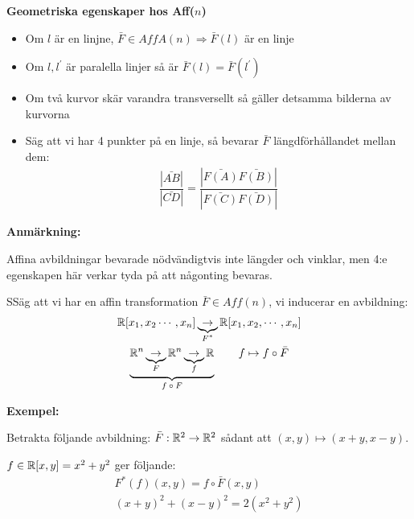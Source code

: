 \par\bigskip
\noindent\textbf{Geometriska egenskaper hos Aff($n$)}\par
\begin{itemize}
  \item Om $l$ är en linjne, $\bar{F}\in AffA(n) \Rightarrow\bar{F}(l)$ är en linje
  \item Om $l,l^{\prime}$ är paralella linjer så är $\bar{F}(l) = \bar{F}(l^{\prime})$
  \item Om två kurvor skär varandra transversellt så gäller detsamma bilderna av kurvorna 
  \item Säg att vi har 4 punkter på en linje, så bevarar $\bar{F}$ längdförhållandet mellan dem:
    \begin{equation*}
      \begin{gathered}
        \dfrac{\left|\bar{AB}\right|}{\left|\bar{CD}\right|} = \dfrac{\left|\bar{F(A)}\bar{F(B)}\right|}{\left|\bar{F(C)}\bar{F(D)}\right|}
      \end{gathered}
    \end{equation*}
\end{itemize}
\par\bigskip
\noindent\textbf{Anmärkning:}\par
\noindent Affina avbildningar bevarade nödvändigtvis inte längder och vinklar, men 4:e egenskapen här verkar tyda på att någonting bevaras.
\par\bigskip
\begin{theo}
  SSäg att vi har en affin transformation $\bar{F}\in Aff(n)$, vi inducerar en avbildning:
  \begin{equation*}
    \begin{gathered}
      \mathbb{R}[x_1,x_2\cdots,x_n]\underbrace{\to}_{\text{$F^*$}}\mathbb{R}[x_1,x_2,\cdots,x_n]\\
      \underbrace{\mathbb{R}^n\underbrace{\to}_{\text{$F$}}\mathbb{R}^n\underbrace{\to}_{\text{$f$}}\mathbb{R}}_{\text{$f\circ F$}}\qquad f\mapsto f\circ \bar{F}
    \end{gathered}
  \end{equation*}
\end{theo}
\par\bigskip
\noindent\textbf{Exempel:}
\par
\noindent Betrakta följande avbildning: $\bar{F}:\mathbb{R}^2\to\mathbb{R}^2$ sådant att $(x,y)\mapsto(x+y,x-y)$.\par
\noindent $f\in \mathbb{R}[x,y] = x^2+y^2$ ger följande:
\begin{equation*}
  \begin{gathered}
    F^*(f)(x,y) = f\circ\bar{F}(x,y)\\
    (x+y)^2+(x-y)^2 = 2(x^2+y^2)
  \end{gathered}
\end{equation*}
